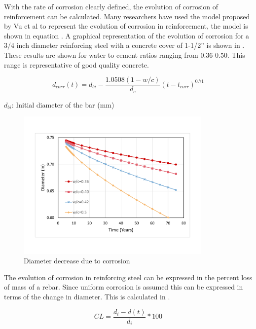 With the rate of corrosion clearly defined, the evolution of corrosion of reinforcement can be calculated. Many researchers have used the model proposed by Vu et al \cite{Stewart1998}\cite{Vu2000}\cite{Choe2008}\cite{Ghosh2010}  to represent the evolution of corrosion in reinforcement, the model is shown in equation  . A graphical representation of the evolution of corrosion for a 3/4 inch diameter reinforcing steel with a concrete cover of 1-1/2” is shown in . These results are shown for water to cement ratios ranging from 0.36-0.50. This range is representative of good quality concrete.

\begin{equation}
  d_{corr}(t)=d_{bi}-\frac{1.0508(1-w/c)}{d_c} (t-t_{corr})^{0.71}
  \label{eq.CorrosionEvolution}
\end{equation} 

$d_{bi}$: Initial diameter of the bar (mm)

\begin{figure}[htbp]
\centering
\includegraphics[width=0.85\textwidth]{Chapter-2/figs/DiameterDecrease}
\caption{Diameter decrease due to corrosion}
\label{fig:DiameterEvolution}
\end{figure}

The evolution of corrosion in reinforcing steel can be expressed in the percent loss of mass of a rebar. Since uniform corrosion is assumed this can be expressed in terms of the change in diameter. This is calculated in .

\begin{equation}
	CL=\frac{d_{i}-d(t)}{d_{i}}*100%
  \label{eq.CorrosionLevel}
\end{equation} 


